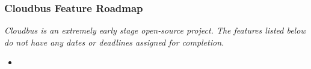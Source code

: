 \begin{frame}
	\frametitle{Cloudbus Feature Roadmap}
	\emph{Cloudbus is an extremely early stage open-source project. The features listed below do not have any dates or deadlines assigned for 
	completion.}
	\begin{itemize}
		\item 
	\end{itemize}
\end{frame}